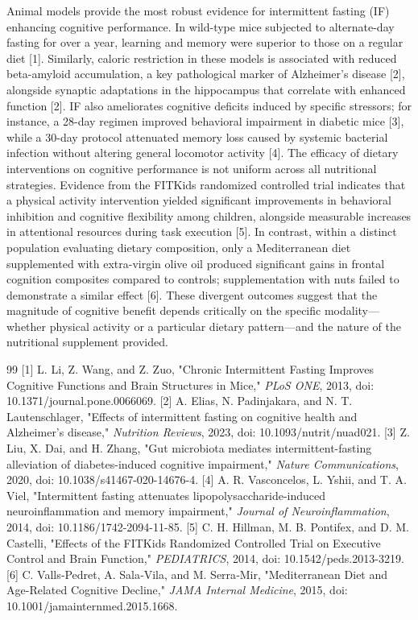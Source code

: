 \documentclass[11pt]{article}
\begin{document}
Animal models provide the most robust evidence for intermittent fasting (IF) enhancing cognitive performance. In wild-type mice subjected to alternate-day fasting for over a year, learning and memory were superior to those on a regular diet [1]. Similarly, caloric restriction in these models is associated with reduced beta-amyloid accumulation, a key pathological marker of Alzheimer's disease [2], alongside synaptic adaptations in the hippocampus that correlate with enhanced function [2]. IF also ameliorates cognitive deficits induced by specific stressors; for instance, a 28-day regimen improved behavioral impairment in diabetic mice [3], while a 30-day protocol attenuated memory loss caused by systemic bacterial infection without altering general locomotor activity [4]. The efficacy of dietary interventions on cognitive performance is not uniform across all nutritional strategies. Evidence from the FITKids randomized controlled trial indicates that a physical activity intervention yielded significant improvements in behavioral inhibition and cognitive flexibility among children, alongside measurable increases in attentional resources during task execution [5]. In contrast, within a distinct population evaluating dietary composition, only a Mediterranean diet supplemented with extra-virgin olive oil produced significant gains in frontal cognition composites compared to controls; supplementation with nuts failed to demonstrate a similar effect [6]. These divergent outcomes suggest that the magnitude of cognitive benefit depends critically on the specific modality—whether physical activity or a particular dietary pattern—and the nature of the nutritional supplement provided.

\begin{thebibliography}{99}
 [1] L. Li, Z. Wang, and Z. Zuo, "Chronic Intermittent Fasting Improves Cognitive Functions and Brain Structures in Mice," \textit{PLoS ONE}, 2013, doi: 10.1371/journal.pone.0066069.
 [2] A. Elias, N. Padinjakara, and N. T. Lautenschlager, "Effects of intermittent fasting on cognitive health and Alzheimer’s disease," \textit{Nutrition Reviews}, 2023, doi: 10.1093/nutrit/nuad021.
 [3] Z. Liu, X. Dai, and H. Zhang, "Gut microbiota mediates intermittent-fasting alleviation of diabetes-induced cognitive impairment," \textit{Nature Communications}, 2020, doi: 10.1038/s41467-020-14676-4.
 [4] A. R. Vasconcelos, L. Yshii, and T. A. Viel, "Intermittent fasting attenuates lipopolysaccharide-induced neuroinflammation and memory impairment," \textit{Journal of Neuroinflammation}, 2014, doi: 10.1186/1742-2094-11-85.
 [5] C. H. Hillman, M. B. Pontifex, and D. M. Castelli, "Effects of the FITKids Randomized Controlled Trial on Executive Control and Brain Function," \textit{PEDIATRICS}, 2014, doi: 10.1542/peds.2013-3219.
 [6] C. Valls‐Pedret, A. Sala‐Vila, and M. Serra‐Mir, "Mediterranean Diet and Age-Related Cognitive Decline," \textit{JAMA Internal Medicine}, 2015, doi: 10.1001/jamainternmed.2015.1668.
\end{thebibliography}
\end{document}
